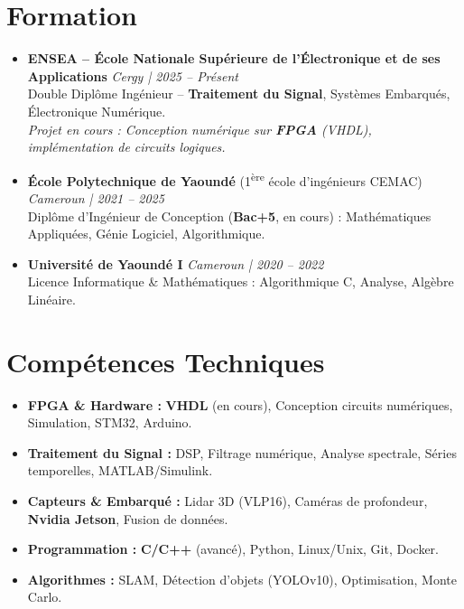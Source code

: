 \documentclass[a4paper,11pt]{article}
\begin{document}
\section{Formation}
\begin{itemize}[leftmargin=*, label=\tiny$\bullet$, nosep]
    \item \textbf{ENSEA -- École Nationale Supérieure de l'Électronique et de ses Applications} \hfill \textit{Cergy | 2025 -- Présent} \\
    \small{Double Diplôme Ingénieur -- \textbf{Traitement du Signal}, Systèmes Embarqués, Électronique Numérique.} \\
    \small{\textit{Projet en cours : Conception numérique sur \textbf{FPGA} (VHDL), implémentation de circuits logiques.}}
    \vspace{2pt}
    \item \textbf{École Polytechnique de Yaoundé} (1\textsuperscript{ère} école d'ingénieurs CEMAC) \hfill \textit{Cameroun | 2021 -- 2025} \\
    \small{Diplôme d'Ingénieur de Conception (\textbf{Bac+5}, en cours) : Mathématiques Appliquées, Génie Logiciel, Algorithmique.}
    \vspace{2pt}
    \item \textbf{Université de Yaoundé I} \hfill \textit{Cameroun | 2020 -- 2022} \\
    \small{Licence Informatique \& Mathématiques : Algorithmique C, Analyse, Algèbre Linéaire.}
\end{itemize}

\section{Compétences Techniques}
\begin{itemize}[leftmargin=*, nosep]
    \item \small{\textbf{FPGA \& Hardware :} \textbf{VHDL} (en cours), Conception circuits numériques, Simulation, STM32, Arduino.}
    \item \small{\textbf{Traitement du Signal :} DSP, Filtrage numérique, Analyse spectrale, Séries temporelles, MATLAB/Simulink.}
    \item \small{\textbf{Capteurs \& Embarqué :} Lidar 3D (VLP16), Caméras de profondeur, \textbf{Nvidia Jetson}, Fusion de données.}
    \item \small{\textbf{Programmation :} \textbf{C/C++} (avancé), Python, Linux/Unix, Git, Docker.}
    \item \small{\textbf{Algorithmes :} SLAM, Détection d'objets (YOLOv10), Optimisation, Monte Carlo.}
\end{itemize}
\end{document}
